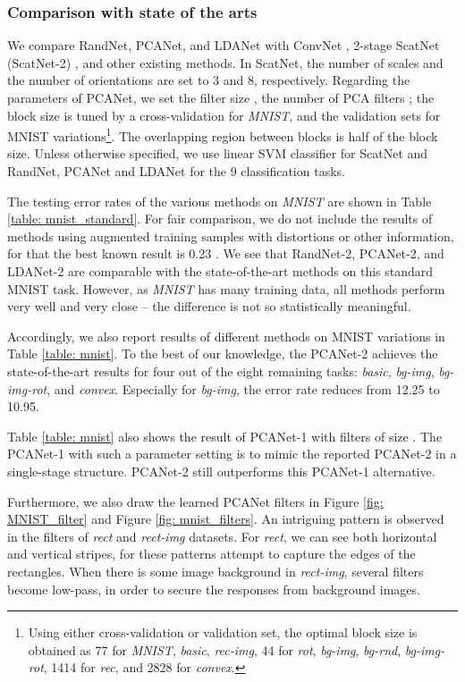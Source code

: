\documentclass[10pt,journal,compsoc]{IEEEtran}
\begin{document}
\subsubsection{Comparison with state of the arts}
We compare RandNet, PCANet, and LDANet with ConvNet \cite{Jarrett2009}, 2-stage ScatNet (ScatNet-2) \cite{Bruna2013}, and other existing methods. In ScatNet, the number of scales and the number of orientations are set to 3 and 8, respectively. Regarding the parameters of PCANet, we set the filter size , the number of PCA filters ; the block size is tuned by a cross-validation for {\it MNIST}, and the validation sets for MNIST variations\footnote{Using either cross-validation or validation set, the optimal block size is obtained as 77 for {\it MNIST}, {\it basic}, {\it rec-img}, 44 for {\it rot}, {\it bg-img}, {\it bg-rnd}, {\it bg-img-rot}, 1414 for {\it rec}, and 2828 for {\it convex}.}. The overlapping region between blocks is half of the block size. Unless otherwise specified, we use linear SVM classifier for ScatNet and RandNet, PCANet and LDANet for the 9 classification tasks.

The testing error rates of the various methods on {\it MNIST} are shown in Table \ref{table: mnist_standard}. For fair comparison, we do not include the results of methods using augmented training samples with distortions or other information, for that the best known result is 0.23 \cite{Ciresan2012}. We see that RandNet-2, PCANet-2, and LDANet-2 are comparable with the state-of-the-art methods on this standard MNIST task.
However, as {\em MNIST} has many training data, all methods perform very well and very close -- the difference is not so statistically meaningful.

Accordingly, we also report results of different methods on MNIST variations in Table \ref{table: mnist}. To the best of our knowledge, the PCANet-2 achieves the state-of-the-art results for four out of the eight remaining tasks: {\it basic}, {\it bg-img}, {\it bg-img-rot}, and {\it convex}. Especially for {\it bg-img}, the error rate reduces from 12.25 \cite{Sohn2013} to 10.95.

Table \ref{table: mnist} also shows the result of PCANet-1 with  filters of size . The PCANet-1 with such a parameter setting is to mimic the reported PCANet-2 in a single-stage structure. PCANet-2 still outperforms this PCANet-1 alternative.

Furthermore, we also draw the learned PCANet filters in Figure \ref{fig: MNIST_filter} and Figure \ref{fig: mnist_filters}. An intriguing pattern is observed in the filters of {\em rect} and {\em rect-img} datasets. For {\em rect}, we can see both horizontal and vertical stripes, for these patterns attempt to capture the edges of the rectangles. When there is some image background in {\em rect-img}, several filters become low-pass, in order to secure the responses from background images.
\end{document}

